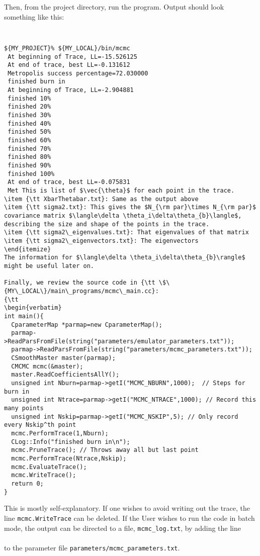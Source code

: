 \documentclass[UserManual.tex]{subfiles}
\begin{document}
Then, from the project directory, run the program. Output should look something like this:
{\tt
\begin{verbatim}
${MY_PROJECT}% ${MY_LOCAL}/bin/mcmc
 At beginning of Trace, LL=-15.526125
 At end of trace, best LL=-0.131612
 Metropolis success percentage=72.030000
 finished burn in
 At beginning of Trace, LL=-2.904881
 finished 10%
 finished 20%
 finished 30%
 finished 40%
 finished 50%
 finished 60%
 finished 70%
 finished 80%
 finished 90%
 finished 100%
 At end of trace, best LL=-0.075831
 Met This is list of $\vec{\theta}$ for each point in the trace.
\item {\tt XbarThetabar.txt}: Same as the output above
\item {\tt sigma2.txt}: This gives the $N_{\rm par}\times N_{\rm par}$ covariance matrix $\langle\delta \theta_i\delta\theta_{b}\langle$, describing the size and shape of the points in the trace.
\item {\tt sigma2\_eigenvalues.txt}: That eigenvalues of that matrix
\item {\tt sigma2\_eigenvectors.txt}: The eigenvectors
\end{itemize}
The information for $\langle\delta \theta_i\delta\theta_{b}\rangle$ might be useful later on.

Finally, we review the source code in {\tt \$\{MY\_LOCAL\}/main\_programs/mcmc\_main.cc}:
{\tt
\begin{verbatim}
int main(){
  CparameterMap *parmap=new CparameterMap();
  parmap->ReadParsFromFile(string("parameters/emulator_parameters.txt"));
  parmap->ReadParsFromFile(string("parameters/mcmc_parameters.txt"));
  CSmoothMaster master(parmap);  
  CMCMC mcmc(&master);
  master.ReadCoefficientsAllY();
  unsigned int Nburn=parmap->getI("MCMC_NBURN",1000);  // Steps for burn in
  unsigned int Ntrace=parmap->getI("MCMC_NTRACE",1000); // Record this many points
  unsigned int Nskip=parmap->getI("MCMC_NSKIP",5); // Only record every Nskip^th point  
  mcmc.PerformTrace(1,Nburn);  
  CLog::Info("finished burn in\n");
  mcmc.PruneTrace(); // Throws away all but last point
  mcmc.PerformTrace(Ntrace,Nskip);
  mcmc.EvaluateTrace();
  mcmc.WriteTrace();
  return 0;
}
\end{verbatim}}
This is mostly self-explanatory. If one wishes to avoid writing out the trace, the line {\tt mcmc.WriteTrace} can be deleted. If the User wishes to run the code in batch mode, the output can be directed to a file, {\tt mcmc\_log.txt}, by adding the line\\
\hspace*{20pt}{\tt MCMC\_LogFileName mcmc\_log.txt} \\
to the parameter file {\tt parameters/mcmc\_parameters.txt}.






 
\end{document}
